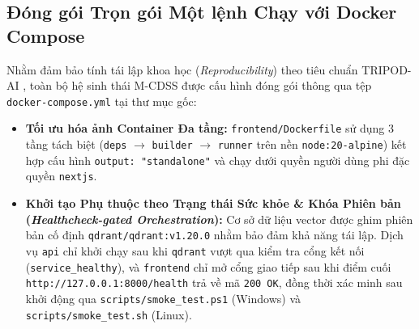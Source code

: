 \subsection{Đóng gói Trọn gói Một lệnh Chạy với Docker Compose}
Nhằm đảm bảo tính tái lập khoa học (\textit{Reproducibility}) theo tiêu chuẩn TRIPOD-AI \cite{collins2021protocol}, toàn bộ hệ sinh thái M-CDSS được cấu hình đóng gói thông qua tệp \texttt{docker-compose.yml} tại thư mục gốc:
\begin{itemize}[leftmargin=1.8em, itemsep=0.2em]
    \item \textbf{Tối ưu hóa ảnh Container Đa tầng:} \texttt{frontend/Dockerfile} sử dụng 3 tầng tách biệt (\texttt{deps} $\rightarrow$ \texttt{builder} $\rightarrow$ \texttt{runner} trên nền \texttt{node:20-alpine}) kết hợp cấu hình \texttt{output: "standalone"} và chạy dưới quyền người dùng phi đặc quyền \texttt{nextjs}.
    \item \textbf{Khởi tạo Phụ thuộc theo Trạng thái Sức khỏe \& Khóa Phiên bản (\textit{Healthcheck-gated Orchestration}):} Cơ sở dữ liệu vector được ghim phiên bản cố định \texttt{qdrant/qdrant:v1.20.0} nhằm bảo đảm khả năng tái lập. Dịch vụ \texttt{api} chỉ khởi chạy sau khi \texttt{qdrant} vượt qua kiểm tra cổng kết nối (\texttt{service\_healthy}), và \texttt{frontend} chỉ mở cổng giao tiếp sau khi điểm cuối \texttt{http://127.0.0.1:8000/health} trả về mã \texttt{200 OK}, đồng thời xác minh sau khởi động qua \texttt{scripts/smoke\_test.ps1} (Windows) và \texttt{scripts/smoke\_test.sh} (Linux).
\end{itemize}
